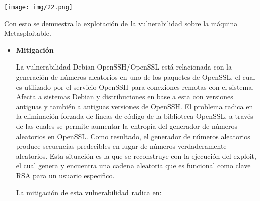 \documentclass[12pt,oneside,a4paper]{book}
\begin{document}
\begin{enumerate}
\vspace{1em}

\begin{center}
    \texttt{[image: img/22.png]}
\end{center}

\vspace{1em}

\hspace{20pt}
Con esto se demuestra la explotación de la vulnerabilidad sobre la máquina Metasploitable.

\vspace{2em}

\begin{itemize}
	\item 	\textbf{Mitigación}

\vspace{1em}

\hspace{20pt}
La vulnerabilidad Debian OpenSSH/OpenSSL está relacionada con la generación de números aleatorios en uno de los paquetes de OpenSSL, el cual es utilizado por el servicio OpenSSH para conexiones remotas con el sistema. Afecta a sistemas Debian y distribuciones en base a esta con versiones antiguas y también a antiguas versiones de OpenSSH. El problema radica en la eliminación forzada de líneas de código de la biblioteca OpenSSL, a través de las cuales se permite aumentar la entropía del generador de números aleatorios en OpenSSL. Como resultado, el generador de números aleatorios produce secuencias predecibles en lugar de números verdaderamente aleatorios. Esta situación es la que se reconstruye con la ejecución del exploit, el cual genera y encuentra una cadena aleatoria que es funcional como clave RSA para un usuario especifico.

\vspace{1em}

\hspace{20pt}
La mitigación de esta vulnerabilidad radica en:

\vspace{1em}


\end{itemize}
\end{enumerate}
\end{document}
